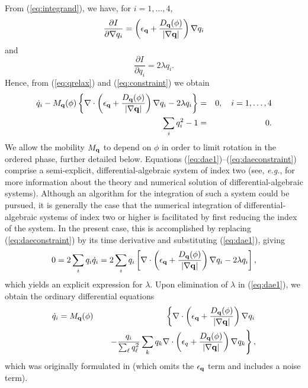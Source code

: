 From (\ref{eq:integrand}), we have, for $i=1,\ldots,4$,
%
\begin{equation}
  \frac{\partial I}{\partial \nabla q_i} =
    \left ( \epsilon_{\bf q} + \frac{D_{\bf q}(\phi) }{| \nabla {\bf q} |} \right )
    \nabla q_i
\label{eq:didnq}
\end{equation}
%
and
%
\begin{equation}
  \frac{\partial I}{\partial q_i} = 2 \lambda q_i.
\label{eq:didq}
\end{equation}
%
Hence, from (\ref{eq:qrelax}) and (\ref{eq:constraint}) we obtain
%
\begin{eqnarray}
  \dot{q}_i - M_{\bf q} (\phi) \left \{ \nabla \cdot \left ( \epsilon_{\bf q} +
    \frac{D_{\bf q}(\phi)}{| \nabla {\bf q} |} \right ) \nabla q_i - 2 \lambda
    q_i \right \} &=& 0, \hspace{1em} i=1,\ldots,4
\label{eq:dae1} \\
  \sum_i q_i^2 - 1 &=& 0.
\label{eq:daeconstraint}
\end{eqnarray}
%
We allow the mobility $M_{\bf q}$ to depend on $\phi$ in order to
limit rotation in the ordered phase, further detailed below.
Equations (\ref{eq:dae1})--(\ref{eq:daeconstraint}) comprise a
semi-explicit, differential-algebraic system of index two (see, {\em
e.g.}, \cite{BCP89} for more information about the theory and
numerical solution of differential-algebraic systems).  Although an
algorithm for the integration of such a system could be pursued, it is
generally the case that the numerical integration of
differential-algebraic systems of index two or higher is facilitated
by first reducing the index of the system.  In the present case, this
is accomplished by replacing (\ref{eq:daeconstraint}) by its time
derivative and substituting (\ref{eq:dae1}), giving
%
\begin{equation}
  0 = 2 \sum_i q_i \dot{q}_i =
    2 \sum_i q_i \left [ \nabla \cdot \left ( \epsilon_{\bf q} +
    \frac{D_{\bf q}(\phi) }{| \nabla {\bf q} |} \right )
    \nabla q_i - 2 \lambda q_i \right ],
\label{eq:difcon}
\end{equation}
%
which yields an explicit expression for $\lambda$.  Upon elimination
of $\lambda$ in (\ref{eq:dae1}), we obtain the ordinary differential
equations
%
\begin{eqnarray}
  \dot{q}_i = M_{\bf q}(\phi) & & \left \{
    \nabla \cdot \left (
    \epsilon_{\bf q} +  \frac{D_{\bf q}(\phi)}{| \nabla {\bf q} |} \right )
    \nabla q_i \right . \nonumber \\
    & & \quad \left . - \frac{q_i}{\sum_\ell q_\ell^2} \sum_k q_k \nabla \cdot
    \left ( \epsilon_q +  \frac{D_{\bf q}(\phi)}{ | \nabla {\bf q} |} \right )
    \nabla q_k \right\},
\label{eq:qeom}
\end{eqnarray}
%
which was originally formulated in \cite{0295-5075-71-1-131} (which
omits the $\epsilon_{\bf q}$ term and includes a noise term).

